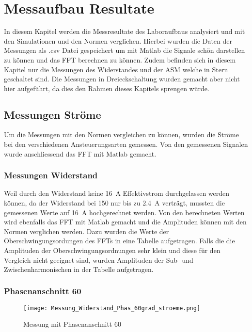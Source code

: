 \section{Messaufbau Resultate}
In diesem Kapitel werden die Messresultate des Laboraufbaus analysiert und mit den Simulationen und den Normen verglichen. Hierbei wurden die Daten der Messungen als .csv Datei gespeichert um mit Matlab die Signale schön darstellen zu können und das FFT berechnen zu können. 
Zudem befinden sich in diesem Kapitel nur die Messungen des Widerstandes und der ASM welche in Stern geschaltet sind. Die Messungen in Dreieckschaltung wurden gemacht aber nicht hier aufgeführt, da dies den Rahmen dieses Kapitels sprengen würde.

\subsection{Messungen Ströme}
Um die Messungen mit den Normen vergleichen zu können, wurden die Ströme bei den verschiedenen Ansteuerungsarten gemessen. Von den gemessenen Signalen wurde anschliessend das FFT mit Matlab gemacht.

\subsubsection{Messungen Widerstand}
Weil durch den Widerstand keine \SI{16}{A} Effektivstrom durchgelassen werden können, da der Widerstand bei \SI{150}{\Omega} nur bis zu \SI{2.4}{A} verträgt, mussten die gemessenen Werte auf \SI{16}{A} hochgerechnet werden. Von den berechneten Werten wird ebenfalls das FFT mit Matlab gemacht und die Amplituden können mit den Normen verglichen werden. Dazu wurden die Werte der Oberschwingungsordungen des FFTs in eine Tabelle aufgetragen. Falls die die Amplituden der Oberschwingungsordnungen sehr klein und diese für den Vergleich nicht geeignet sind, wurden Amplituden der Sub- und Zwischenharmonischen in der Tabelle aufgetragen.

\subsubsection*{Phasenanschnitt 60\textdegree}

\begin{figure}[ht!]
	\centering
	\texttt{[image: Messung\_Widerstand\_Phas\_60grad\_stroeme.png]}	
	\caption{Messung mit Phasenanschnitt 60\textdegree}\label{fig:Mess_Widerstand_Phas_60grad_stroeme}
\end{figure}

